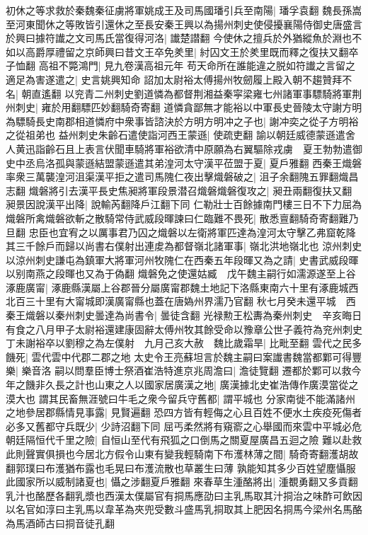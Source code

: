 初休之等求救於秦魏秦征虜將軍姚成王及司馬國璠引兵至南陽|{
	璠孚袁翻}
魏長孫嵩至河東聞休之等敗皆引還休之至長安秦王興以為揚州刺史使侵擾襄陽侍御史唐盛言於興曰據符䜟之文司馬氏當復得河洛|{
	䜟楚譛翻}
今使休之擅兵於外猶縱魚於淵也不如以高爵厚禮留之京師興曰昔文王卒免羑里|{
	紂囚文王於羑里既而釋之復扶又翻卒子恤翻}
高祖不斃鴻門|{
	見九卷漢高祖元年}
苟天命所在誰能違之脱如符䜟之言留之適足為害遂遣之|{
	史言姚興知命}
詔加太尉裕太傅揚州牧劒履上殿入朝不趨贊拜不名|{
	朝直遙翻}
以兖青二州刺史劉道憐為都督荆湘益秦寜梁雍七州諸軍事驃騎將軍荆州刺史|{
	雍於用翻驃匹妙翻騎奇寄翻}
道憐貪鄙無才能裕以中軍長史晉陵太守謝方明為驃騎長史南郡相道憐府中衆事皆諮決於方明方明冲之子也|{
	謝冲奕之從子方明裕之從祖弟也}
益州刺史朱齡石遣使詣河西王蒙遜|{
	使疏吏翻}
諭以朝廷威德蒙遜遣舍人黄迅詣齡石且上表言伏聞車騎將軍裕欲清中原願為右翼驅除戎虜　夏王勃勃遣御史中丞烏洛孤與蒙遜結盟蒙遜遣其弟湟河太守漢平莅盟于夏|{
	夏戶雅翻}
西秦王熾磐率衆三萬襲湟河沮渠漢平拒之遣司馬隗仁夜出擊熾磐破之|{
	沮子余翻隗五罪翻熾昌志翻}
熾磐將引去漢平長史焦昶將軍段景潜召熾磐熾磐復攻之|{
	昶丑兩翻復扶又翻}
昶景因說漢平出降|{
	說輸芮翻降戶江翻下同}
仁勒壯士百餘據南門樓三日不下力屈為熾磐所禽熾磐欲斬之散騎常侍武威段暉諫曰仁臨難不畏死|{
	散悉亶翻騎奇寄翻難乃旦翻}
忠臣也宜宥之以厲事君乃囚之熾磐以左衛將軍匹達為湟河太守擊乙弗窟乾降其三千餘戶而歸以尚書右僕射出連䖍為都督嶺北諸軍事|{
	嶺北洪地嶺北也}
涼州刺史以涼州刺史謙屯為鎮軍大將軍河州牧隗仁在西秦五年段暉又為之請|{
	史書武威段暉以别南燕之段暉也又為于偽翻}
熾磐免之使還姑臧　戊午魏主嗣行如濡源遂至上谷涿鹿廣甯|{
	涿鹿縣漢屬上谷郡晉分屬廣甯郡魏土地記下洛縣東南六十里有涿鹿城西北百三十里有大甯城即漢廣甯縣也蓋在唐媯州界濡乃官翻}
秋七月癸未還平城　西秦王熾磐以秦州刺史曇達為尚書令|{
	曇徒含翻}
光禄勲王松夀為秦州刺史　辛亥晦日有食之八月甲子太尉裕還建康固辭太傅州牧其餘受命以豫章公世子義符為兖州刺史　丁未謝裕卒以劉穆之為左僕射　九月己亥大赦　魏比歲霜旱|{
	比毗至翻}
雲代之民多饑死|{
	雲代雲中代郡二郡之地}
太史令王亮蘇坦言於魏主嗣曰案䜟書魏當都鄴可得豐樂|{
	樂音洛}
嗣以問羣臣博士祭酒崔浩特進京兆周澹曰|{
	澹徒覽翻}
遷都於鄴可以救今年之饑非久長之計也山東之人以國家居廣漢之地|{
	廣漢據北史崔浩傳作廣漠當從之漠大也}
謂其民畜無涯號曰牛毛之衆今留兵守舊都|{
	謂平城也}
分家南徙不能滿諸州之地參居郡縣情見事露|{
	見賢遍翻}
恐四方皆有輕侮之心且百姓不便水土疾疫死傷者必多又舊都守兵既少|{
	少詩沼翻下同}
屈丐柔然將有窺窬之心舉國而來雲中平城必危朝廷隔恒代千里之險|{
	自恒山至代有飛狐之口倒馬之關夏屋廣昌五迴之險}
難以赴救此則聲實俱損也今居北方假令山東有變我輕騎南下布濩林薄之間|{
	騎奇寄翻濩胡故翻郭璞曰布濩猶布露也毛晃曰布濩流散也草叢生曰薄}
孰能知其多少百姓望塵懾服此國家所以威制諸夏也|{
	懾之涉翻夏戶雅翻}
來春草生湩酪將出|{
	湩覩勇翻又多貢翻乳汁也酪歷各翻乳漿也西漢太僕屬官有挏馬應劭曰主乳馬取其汁挏治之味酢可飲因以名官如淳曰主乳馬以韋革為夾兜受數斗盛馬乳挏取其上肥因名挏馬今梁州名馬酪為馬酒師古曰挏音徒孔翻}
